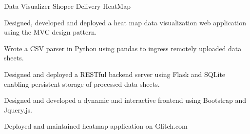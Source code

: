 \cventry
{Data Visualizer} %
{Shopee Delivery HeatMap} %
{\href{https://github.com/giathuan123/HeatMap}{\faGithubSquare}} %
{\diExpressOriginal \diNodejsPlain \diBootstrapPlain \diJqueryPlain \diPythonPlain } %
{
	\begin{cvitems} %
		\item Designed, developed and deployed a heat map data visualization web application
		using the MVC design pattern.
		\item Wrote a CSV parser in Python using pandas to ingress remotely uploaded data
		sheets.
		\item Designed and deployed a RESTful backend server using Flask and SQLite enabling
		persistent storage of processed data sheets.
		\item Designed and developed a dynamic and interactive frontend using Bootstrap and
		Jquery.js.
		\item Deployed and maintained heatmap application on Glitch.com
	\end{cvitems}
}
